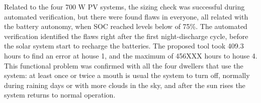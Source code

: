 \documentclass[journal]{IEEEtran}
\begin{document}
Related to the four 700 W PV systems, the sizing check was successful during automated verification, but there were found flaws in everyone, all related with the battery autonomy, when SOC reached levels below of 75\%. The automated verification identified the flaws right after the first night-discharge cycle, before the solar system start to recharge the batteries. The proposed tool took 409.3 hours to find an error at house 1, and the maximum of 456XXX hours to house 4. This functional problem was confirmed with all the four dwellers that use the system: at least once or twice a mouth is usual the system to turn off, normally during raining days or with more clouds in the sky, and after the sun rises the system returns to normal operation.

%
%
%
\end{document}
